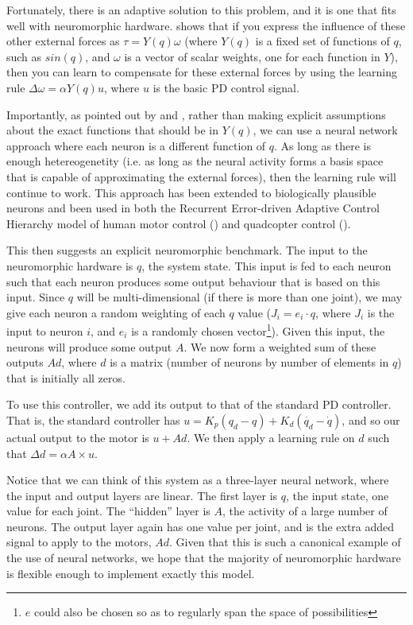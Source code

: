 \documentclass{frontiersSCNS} %
\begin{document}
Fortunately, there is an adaptive solution to this problem, and it is one that
fits well with neuromorphic hardware.  \cite{Slotine1987} shows that if you
express the influence of these other external forces as $\tau=Y(q) \omega$
(where $Y(q)$ is a fixed set of functions of $q$, such as $sin(q)$, and $\omega$
is a vector of scalar weights, one for each function in $Y$), then you can learn
to compensate for these external forces by using the learning rule $\Delta \omega = \alpha Y(q) u$,
where $u$ is the basic PD control signal.

Importantly, as pointed out by \cite{SannerSlotine1992} and \cite{Lewis1996}, rather than making explicit
assumptions about the exact functions that should be in $Y(q)$, we can use
a neural network approach where each neuron is a different function of $q$.  
As long as there is enough hetereogenetity (i.e. as long as the neural activity
forms a basis space that is capable of approximating the external forces), then the
learning rule will continue to work.  This approach has been extended to
biologically plausible neurons and been used in both the
Recurrent Error-driven Adaptive Control Hierarchy model of human motor control
(\citealt{dewolf2014}) and quadcopter control (\citealt{KomerThesis}).

This then suggests an explicit neuromorphic benchmark.  The input to the
neuromorphic hardware is $q$, the system state.  This input is fed to each
neuron such that each neuron produces some output behaviour that is based on
this input.  Since $q$ will be multi-dimensional (if there is more than one
joint), we may give each neuron a random weighting of each $q$ value ($J_i=e_i \cdot q$, 
where $J_i$ is the input to neuron $i$, and $e_i$ is a randomly chosen vector\footnote{$e$ could also be chosen so as to regularly span the space of possibilities}).  Given this input, the neurons will produce some output $A$.
We now form a weighted sum of these outputs $Ad$, where $d$ is a matrix (number of neurons by number of elements in $q$)
that is initially all zeros.

To use this controller, we add its output to that of the standard PD controller.
That is, the standard controller has $u=K_p(q_d - q) + K_d(\dot{q_d} - \dot{q})$,
and so our actual output to the motor is $u + Ad$.  We then apply a learning
rule on $d$ such that $\Delta d = \alpha A \times u$.

Notice that we can think of this system as a three-layer neural
network, where the input and output layers are linear.  The first layer is $q$, the input state, one value for each joint.  The ``hidden'' layer
is $A$, the activity of a large number of neurons.  The output layer again has
one value per joint, and is the extra added signal to apply to the motors, $Ad$.
Given that this is such a canonical example of the use of neural networks, we
hope that the majority of neuromorphic hardware is flexible enough to implement
exactly this model.
\end{document}
